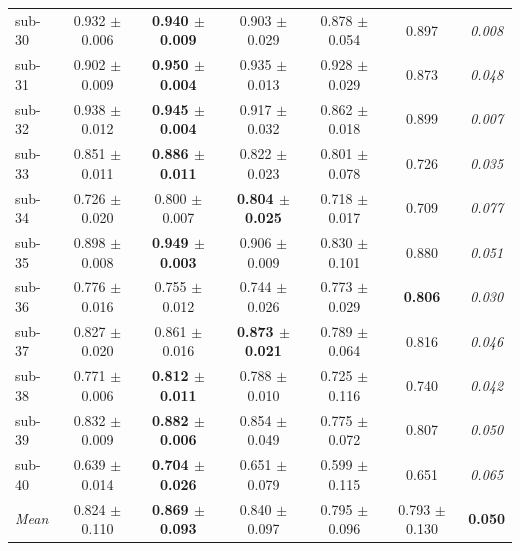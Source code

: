 \begin{table}[t]
\begin{tabular}{lcccccc}
sub-30 & 0.932 $\pm$ 0.006 & \textbf{0.940 $\pm$ 0.009} & 0.903 $\pm$ 0.029 & 0.878 $\pm$ 0.054 & 0.897 & \textit{0.008} \\
sub-31 & 0.902 $\pm$ 0.009 & \textbf{0.950 $\pm$ 0.004} & 0.935 $\pm$ 0.013 & 0.928 $\pm$ 0.029 & 0.873 & \textit{0.048} \\
sub-32 & 0.938 $\pm$ 0.012 & \textbf{0.945 $\pm$ 0.004} & 0.917 $\pm$ 0.032 & 0.862 $\pm$ 0.018 & 0.899 & \textit{0.007} \\
sub-33 & 0.851 $\pm$ 0.011 & \textbf{0.886 $\pm$ 0.011} & 0.822 $\pm$ 0.023 & 0.801 $\pm$ 0.078 & 0.726 & \textit{0.035} \\
sub-34 & 0.726 $\pm$ 0.020 & 0.800 $\pm$ 0.007 & \textbf{0.804 $\pm$ 0.025} & 0.718 $\pm$ 0.017 & 0.709 & \textit{0.077} \\
sub-35 & 0.898 $\pm$ 0.008 & \textbf{0.949 $\pm$ 0.003} & 0.906 $\pm$ 0.009 & 0.830 $\pm$ 0.101 & 0.880 & \textit{0.051} \\
sub-36 & 0.776 $\pm$ 0.016 & 0.755 $\pm$ 0.012 & 0.744 $\pm$ 0.026 & 0.773 $\pm$ 0.029 & \textbf{0.806} & \textit{0.030} \\
sub-37 & 0.827 $\pm$ 0.020 & 0.861 $\pm$ 0.016 & \textbf{0.873 $\pm$ 0.021} & 0.789 $\pm$ 0.064 & 0.816 & \textit{0.046} \\
sub-38 & 0.771 $\pm$ 0.006 & \textbf{0.812 $\pm$ 0.011} & 0.788 $\pm$ 0.010 & 0.725 $\pm$ 0.116 & 0.740 & \textit{0.042} \\
sub-39 & 0.832 $\pm$ 0.009 & \textbf{0.882 $\pm$ 0.006} & 0.854 $\pm$ 0.049 & 0.775 $\pm$ 0.072 & 0.807 & \textit{0.050} \\
sub-40 & 0.639 $\pm$ 0.014 & \textbf{0.704 $\pm$ 0.026} & 0.651 $\pm$ 0.079 & 0.599 $\pm$ 0.115 & 0.651 & \textit{0.065} \\
\midrule
\textit{Mean} & 0.824 $\pm$ 0.110 & \textbf{0.869 $\pm$ 0.093} & 0.840 $\pm$ 0.097 & 0.795 $\pm$ 0.096 & 0.793 $\pm$ 0.130 & \textbf{0.050} \\
\bottomrule
\end{tabular}
\end{table}


